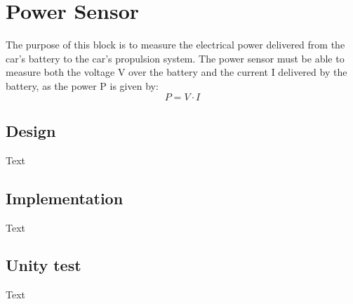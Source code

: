 \section{Power Sensor}
The purpose of this block is to measure the electrical power delivered from the car's battery to the car's propulsion system. The power sensor must be able to measure both the voltage V over the battery and the current I delivered by the battery, as the power P is given by:
\begin{equation}
	P = V \cdot I
\end{equation}

\subsection{Design}
Text

\subsection{Implementation}
Text

\subsection{Unity test}
Text